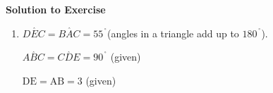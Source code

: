 {\begin{mdframed}[linewidth=4, leftmargin=40, rightmargin=40]
\begin{exercise}
\label{m39368*eip-477}\noindent\textbf{Solution to Exercise }
  \label{m39368*eip-156}\begin{enumerate}[noitemsep, label=\textbf{Step} \textbf{\arabic*}. ] 
            \leftskip=20pt\rightskip=\leftskip\item \label{m39368*id65234}\begin{math}D\stackrel{ˆ}{E}C=B\stackrel{ˆ}{A}C={55}^{\ensuremath{{\,}^{\circ}}}\end{math}\hspace{1ex}(angles in a triangle add up to 
\begin{math}{180}^{\ensuremath{{\,}^{\circ}}}\end{math}).\par 
      \label{m39368*id1166232344812}\begin{math}A\stackrel{ˆ}{B}C=C\stackrel{ˆ}{D}E={90}^{\ensuremath{{\,}^{\circ}}}\end{math}\hspace{1ex} (given)\par 
      \label{m39368*id1166233687055}\begin{math}\text{DE}=\text{AB}=3\end{math}\hspace{1ex} (given)\par 
      \label{m39368*id1166230595268}\nopagebreak\noindent{}
    

\end{enumerate}
\end{exercise}
\end{mdframed}}
